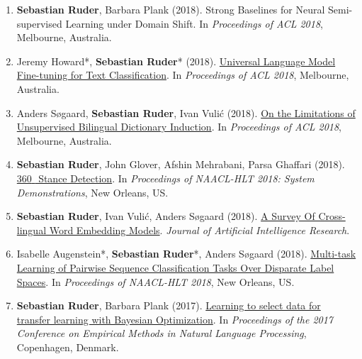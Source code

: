 \documentclass[10pt,letterpaper]{article}
\begin{document}
\begin{enumerate}
	\parskip=0.1em
	
	\item \textbf{Sebastian Ruder}, Barbara Plank (2018). Strong Baselines for Neural Semi-supervised Learning under Domain Shift. In \textit{Proceedings of ACL 2018}, Melbourne, Australia.

	\item Jeremy Howard*, \textbf{Sebastian Ruder}* (2018). \href{https://arxiv.org/abs/1801.06146}{Universal Language Model Fine-tuning for Text Classification}. In \textit{Proceedings of ACL 2018}, Melbourne, Australia.

	\item Anders Søgaard, \textbf{Sebastian Ruder}, Ivan Vulić (2018). \href{https://arxiv.org/abs/1805.03620}{On the Limitations of Unsupervised Bilingual Dictionary Induction}. In \textit{Proceedings of ACL 2018}, Melbourne, Australia.
	
	\item \textbf{Sebastian Ruder}, John Glover, Afshin Mehrabani, Parsa Ghaffari (2018). \href{https://arxiv.org/abs/1804.00982}{360\textdegree $\!$ $\!$ Stance Detection}. In \textit{Proceedings of NAACL-HLT 2018: System Demonstrations}, New Orleans, US. 

	\item \textbf{Sebastian Ruder}, Ivan Vulić, Anders Søgaard (2018). \href{https://arxiv.org/abs/1706.04902}{A Survey Of Cross-lingual Word Embedding Models}. \textit{Journal of Artificial Intelligence Research}.

	\item Isabelle Augenstein*, \textbf{Sebastian Ruder}*, Anders Søgaard (2018). \href{https://arxiv.org/abs/1802.09913}{Multi-task Learning of Pairwise Sequence Classification Tasks Over Disparate Label Spaces}. In \textit{Proceedings of NAACL-HLT 2018}, New Orleans, US. 
	
	\newenvironment{starfootnotes}
  {\par\edef\savedfootnotenumber{\number\value{footnote}}
   \renewcommand{\thefootnote}{$\star$} 
   \setcounter{footnote}{0}}
  {\par\setcounter{footnote}{\savedfootnotenumber}}
	
\begin{starfootnotes}
\end{starfootnotes}
		
	\item \textbf{Sebastian Ruder}, Barbara Plank (2017). \href{https://arxiv.org/abs/1707.05246}{Learning to select data for transfer learning with Bayesian Optimization}. In \textit{Proceedings of the 2017 Conference on Empirical Methods in Natural Language Processing}, Copenhagen, Denmark.
	

\end{enumerate}
\end{document}
